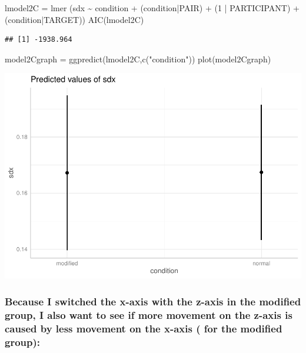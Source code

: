 \documentclass[
]{article}
\newenvironment{Shaded}{\begin{snugshade}}{\end{snugshade}}
\newcommand{\DecValTok}[1]{\textcolor[rgb]{0.00,0.00,0.81}{#1}}
\newcommand{\FunctionTok}[1]{\textcolor[rgb]{0.00,0.00,0.00}{#1}}
\newcommand{\NormalTok}[1]{#1}
\newcommand{\OtherTok}[1]{\textcolor[rgb]{0.56,0.35,0.01}{#1}}
\newcommand{\SpecialCharTok}[1]{\textcolor[rgb]{0.00,0.00,0.00}{#1}}
\newcommand{\StringTok}[1]{\textcolor[rgb]{0.31,0.60,0.02}{#1}}
\begin{document}
\begin{Shaded}
\begin{Highlighting}[]
\NormalTok{lmodel2C }\OtherTok{=}  \FunctionTok{lmer}\NormalTok{ (sdx }\SpecialCharTok{\textasciitilde{}}\NormalTok{   condition }\SpecialCharTok{+}\NormalTok{ (condition}\SpecialCharTok{|}\NormalTok{PAIR) }\SpecialCharTok{+}\NormalTok{ (}\DecValTok{1} \SpecialCharTok{|}\NormalTok{ PARTICIPANT) }\SpecialCharTok{+}\NormalTok{(condition}\SpecialCharTok{|}\NormalTok{TARGET))}
\FunctionTok{AIC}\NormalTok{(lmodel2C)}
\end{Highlighting}
\end{Shaded}

\begin{verbatim}
## [1] -1938.964
\end{verbatim}

\begin{Shaded}
\begin{Highlighting}[]
\NormalTok{model2Cgraph }\OtherTok{=} \FunctionTok{ggpredict}\NormalTok{(lmodel2C,}\FunctionTok{c}\NormalTok{(}\StringTok{"condition"}\NormalTok{))}
\FunctionTok{plot}\NormalTok{(model2Cgraph)}
\end{Highlighting}
\end{Shaded}

\includegraphics{Report_files/figure-latex/pressure-2.pdf}

\hypertarget{because-i-switched-the-x-axis-with-the-z-axis-in-the-modified-group-i-also-want-to-see-if-more-movement-on-the-z-axis-is-caused-by-less-movement-on-the-x-axis-for-the-modified-group}{%
\subsubsection{Because I switched the x-axis with the z-axis in the
modified group, I also want to see if more movement on the z-axis is
caused by less movement on the x-axis ( for the modified
group):}\label{because-i-switched-the-x-axis-with-the-z-axis-in-the-modified-group-i-also-want-to-see-if-more-movement-on-the-z-axis-is-caused-by-less-movement-on-the-x-axis-for-the-modified-group}}
\end{document}
